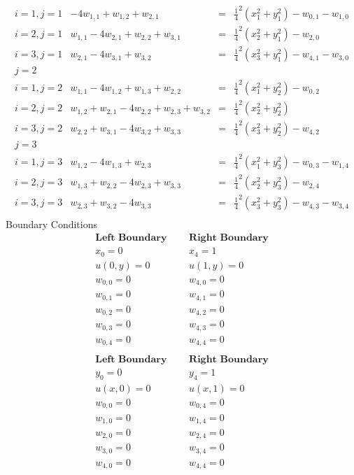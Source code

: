 \[\begin{array}{l|rcl}
i=1,j=1&-4w_{1,1}+w_{1,2}+w_{2,1}&=&\frac{1}{4}^2(x_1^2+y_1^2)-w_{0,1}-w_{1,0}\\
i=2,j=1&w_{1,1}-4w_{2,1}+w_{2,2}+w_{3,1}&=&\frac{1}{4}^2(x_2^2+y_1^2)-w_{2,0}\\
i=3,j=1&w_{2,1}-4w_{3,1}+w_{3,2}&=&\frac{1}{4}^2(x_3^2+y_1^2)-w_{4,1}-w_{3,0}\\
j=2\\
i=1,j=2&w_{1,1}-4w_{1,2}+w_{1,3}+w_{2,2}&=&\frac{1}{4}^2(x_1^2+y_2^2)-w_{0,2}\\
i=2,j=2&w_{1,2}+w_{2,1}-4w_{2,2}+w_{2,3}+w_{3,2}&=&\frac{1}{4}^2(x_2^2+y_2^2)\\
i=3,j=2&w_{2,2}+w_{3,1}-4w_{3,2}+w_{3,3}&=&\frac{1}{4}^2(x_3^2+y_2^2)-w_{4,2}\\
j=3\\
i=1,j=3&w_{1,2}-4w_{1,3}+w_{2,3}&=&\frac{1}{4}^2(x_1^2+y_3^2)-w_{0,3}-w_{1,4}\\
i=2,j=3&w_{1,3}+w_{2,2}-4w_{2,3}+w_{3,3}&=&\frac{1}{4}^2(x_2^2+y_3^2)-w_{2,4}\\
i=3,j=3&w_{2,3}+w_{3,2}-4w_{3,3}&=&\frac{1}{4}^2(x_3^2+y_3^2)-w_{4,3}-w_{3,4}\\
\end{array}
\]	
Boundary Conditions
\[
\begin{array}{lcl}
\textbf{Left Boundary}&\ \ \ & \textbf{Right Boundary} \\
x_0=0&\ \ \ & x_4=1\\
u(0,y)=0&\ \ \ & u(1,y)=0\\
w_{0,0}=0 &\ \ \ & w_{4,0}=0 \\ 
w_{0,1}=0& \ \ \ & w_{4,1}=0 \\
w_{0,2}=0 & \ \ \ & w_{4,2}=0  \\
w_{0,3}=0& \ \ \ & w_{4,3}=0  \\
w_{0,4}=0 & \ \ \ & w_{4,4}=0  \\

\end{array}
\]
\[
\begin{array}{lcl}
\textbf{Left Boundary}&\ \ \ & \textbf{Right Boundary} \\
y_0=0&\ \ \ & y_4=1 \\
u(x,0)=0&\ \ \ & u(x,1)=0 \\

w_{0,0}=0 & \ \ \ & w_{0,4}=0\\ 
w_{1,0}=0  & \ \ \ & w_{1,4}=0 \\
w_{2,0}=0  & \ \ \ & w_{2,4}=0 \\
w_{3,0}=0  & \ \ \ & w_{3,4}=0 \\
w_{4,0}=0  & \ \ \ & w_{4,4}=0 \\

\end{array}
\]

